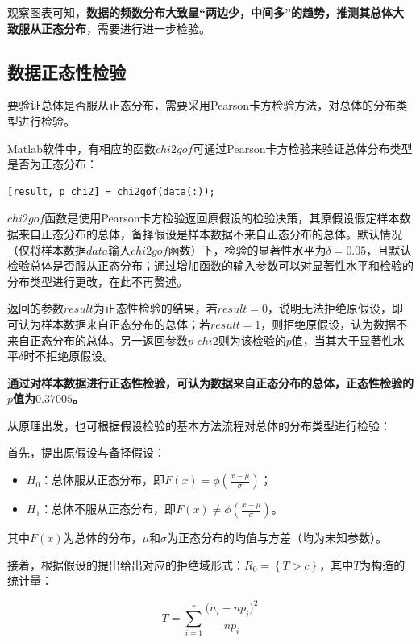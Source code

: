 \documentclass[12pt]{article}  %
\begin{document}
观察图表可知，\textbf{数据的频数分布大致呈“两边少，中间多”的趋势，推测其总体大致服从正态分布}，需要进行进一步检验。

\subsection{数据正态性检验}
要验证总体是否服从正态分布，需要采用Pearson卡方检验方法，对总体的分布类型进行检验。

Matlab软件中，有相应的函数$chi2gof$可通过Pearson卡方检验来验证总体分布类型是否为正态分布：

\begin{lstlisting}
[result, p_chi2] = chi2gof(data(:));
\end{lstlisting}

$chi2gof$函数是使用Pearson卡方检验返回原假设的检验决策，其原假设假定样本数据来自正态分布的总体，备择假设是样本数据不来自正态分布的总体。默认情况（仅将样本数据$data$输入$chi2gof$函数）下，检验的显著性水平为$\delta=0.05$，且默认检验总体是否服从正态分布；通过增加函数的输入参数可以对显著性水平和检验的分布类型进行更改，在此不再赘述。

返回的参数$result$为正态性检验的结果，若$result=0$，说明无法拒绝原假设，即可认为样本数据来自正态分布的总体；若$result=1$，则拒绝原假设，认为数据不来自正态分布的总体。另一返回参数$p\_chi2$则为该检验的$p$值，当其大于显著性水平$\delta$时不拒绝原假设。

\textbf{通过对样本数据进行正态性检验，可认为数据来自正态分布的总体，正态性检验的$p$值为$0.37005$。}

从原理出发，也可根据假设检验的基本方法流程对总体的分布类型进行检验：

首先，提出原假设与备择假设：
\begin{itemize}
	\setlength{\parsep}{0ex} %
	\setlength{\topsep}{2ex} %
	\setlength{\itemsep}{1ex} %
	\item \textbf{$H_0$}：总体服从正态分布，即$F(x) = \phi(\frac{x-\mu}{\sigma})$；		
	\item \textbf{$H_1$}：总体不服从正态分布，即$F(x) \neq \phi(\frac{x-\mu}{\sigma})$。
\end{itemize}

其中$F(x)$为总体的分布，$\mu$和$\sigma$为正态分布的均值与方差（均为未知参数）。

接着，根据假设的提出给出对应的拒绝域形式：$R_0 = \left\{ T>c \right\} $，其中$T$为构造的统计量：

\begin{equation}
	T=\sum_{i=1}^{r}\frac{{{(n_i-np}_i)}^2}{np_i}
\end{equation}
\end{document}
